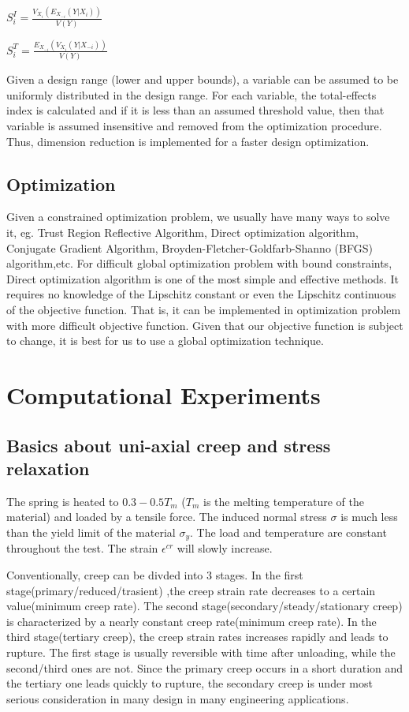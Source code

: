 \documentclass[10pt]{article}
\begin{document}
\centerline{$S_{i}^{I} = \frac{V_{X_i}(E_{X_{-i}}(Y|X_{i}))}{V(Y)}$}
\centerline{$S_{i}^{T} = \frac{E_{X_{-i}}(V_{X_{i}}(Y|X_{-i}))}{V(Y)}$}

Given a design range (lower and upper bounds), a variable can be assumed to be uniformly distributed in the design range. For each variable, the total-effects index is calculated and if it is less than an assumed threshold value, then that variable is assumed insensitive and removed from the optimization procedure. Thus, dimension reduction is implemented for a faster design optimization.\cite{Bioinformatics} \cite{Wrappers} \cite{Error} \cite{Global}
\subsection{Optimization}
\label{sec:Optimization}
Given a constrained optimization problem, we usually have many ways to solve it, eg. Trust Region Reflective Algorithm, Direct optimization algorithm, Conjugate Gradient Algorithm, Broyden-Fletcher-Goldfarb-Shanno (BFGS) algorithm,etc. For difficult global optimization problem with bound constraints, Direct optimization algorithm is one of the most simple and effective methods. It requires no knowledge of the Lipschitz constant or even the Lipschitz continuous of the objective function. That is, it can be implemented in optimization problem with more difficult objective function. Given that our objective function is subject to change, it is best for us to use a global optimization technique. 

\cite{Derivative} \cite{DirectPaper} \cite{MATLAB:2014a} \cite{DirectUserGuide}
 
 

\section{Computational Experiments}
\label{sec:Experiments}
\subsection{Basics about uni-axial creep and stress relaxation}
The spring is heated to $0.3-0.5T_m$ ($T_m$ is the melting temperature of the material) and loaded by a tensile force. The induced normal stress $\sigma$ is much less than the yield limit of the material $\sigma_y$. The load and temperature are constant throughout the test. The strain $\epsilon^{cr}$ will slowly increase.

Conventionally, creep can be divded into $3$ stages. In the first stage(primary/reduced/trasient) ,the creep strain rate decreases to a certain value(minimum creep rate). The second stage(secondary/steady/stationary creep) is characterized by a nearly constant creep rate(minimum creep rate). In the third stage(tertiary creep), the creep strain rates increases rapidly and leads to rupture. The first stage is usually reversible with time after unloading, while the second/third ones are not. Since the primary creep occurs in a short duration and the tertiary one leads quickly to rupture, the secondary creep is under most serious consideration in many design in many engineering applications.
\end{document}

